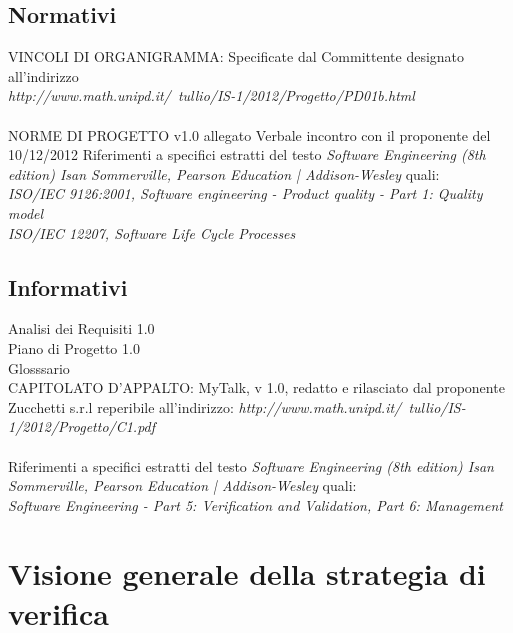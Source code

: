 \subsection{Normativi}
VINCOLI DI ORGANIGRAMMA: Specificate dal Committente designato all'indirizzo\\ \textit{http://www.math.unipd.it/~tullio/IS-1/2012/Progetto/PD01b.html} \\\\
NORME DI PROGETTO  v1.0 allegato
Verbale incontro con il proponente del 10/12/2012
Riferimenti a specifici estratti del testo \textit{Software Engineering (8th edition) Isan Sommerville, Pearson Education | Addison-Wesley} quali:\\
\textit{ISO/IEC 9126:2001, Software engineering - Product quality - Part 1: Quality model}\\
\textit{ISO/IEC 12207, Software Life Cycle Processes}\\
\subsection{Informativi}
Analisi dei Requisiti 1.0\\
Piano di Progetto 1.0\\
Glosssario\\
CAPITOLATO D'APPALTO: MyTalk, v 1.0, redatto e rilasciato dal proponente Zucchetti s.r.l reperibile all'indirizzo: \textit{http://www.math.unipd.it/~tullio/IS-1/2012/Progetto/C1.pdf} \\\\
Riferimenti a specifici estratti del testo \textit{Software Engineering (8th edition) Isan Sommerville, Pearson Education | Addison-Wesley} quali:\\
\textit{Software Engineering - Part 5: Verification and Validation, Part 6: Management}\\


\section{Visione generale della strategia di verifica}
